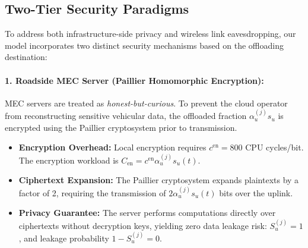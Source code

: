 \documentclass[12pt,a4paper]{article}
\begin{document}
\subsection{Two-Tier Security Paradigms}
\label{subsec:security_paradigms}
To address both infrastructure-side privacy and wireless link eavesdropping, our model incorporates two distinct security mechanisms based on the offloading destination:

\paragraph{1. Roadside MEC Server (Paillier Homomorphic Encryption):}
MEC servers are treated as \emph{honest-but-curious}. To prevent the cloud operator from reconstructing sensitive vehicular data, the offloaded fraction $\alpha_u^{(j)} s_u$ is encrypted using the Paillier cryptosystem prior to transmission.
\begin{itemize}
    \item \textbf{Encryption Overhead:} Local encryption requires $c^{\mathrm{en}} = 800$ CPU cycles/bit. The encryption workload is $C_{\mathrm{en}} = c^{\mathrm{en}} \alpha_u^{(j)} s_u(t)$.
    \item \textbf{Ciphertext Expansion:} The Paillier cryptosystem expands plaintexts by a factor of 2, requiring the transmission of $2 \alpha_u^{(j)} s_u(t)$ bits over the uplink.
    \item \textbf{Privacy Guarantee:} The server performs computations directly over ciphertexts without decryption keys, yielding zero data leakage risk: $S_u^{(j)} = 1$, and leakage probability $1 - S_u^{(j)} = 0$.
\end{itemize}
\end{document}
